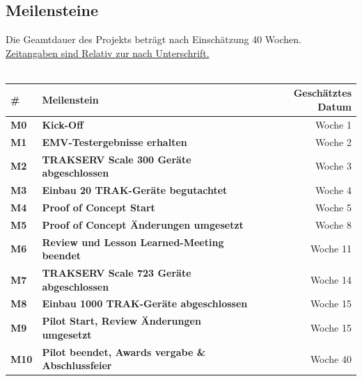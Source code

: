 \documentclass[a4paper,10pt]{scrartcl}
\begin{document}
\subsection{Meilensteine}
Die Geamtdauer des Projekts beträgt nach Einschätzung 40 Wochen.\\
\uline{Zeitangaben sind Relativ zur nach Unterschrift.}\\
\vspace{5mm}\\
\begin{tabular}{llr} 
\toprule
\textbf{\#} & \textbf{Meilenstein} & \textbf{Geschätztes Datum}\\ 
\midrule 
\midrule
\textbf{M0}  & \textbf{Kick-Off} & Woche 1\\
\midrule
\textbf{M1}  & \textbf{EMV-Testergebnisse erhalten} & Woche 2\\ %
\midrule
\textbf{M2}  & \textbf{TRAKSERV Scale 300 Geräte abgeschlossen} & Woche 3\\ %
\midrule
\textbf{M3}  & \textbf{Einbau 20 TRAK-Geräte begutachtet} & Woche 4\\ %
\midrule
\textbf{M4}  & \textbf{Proof of Concept Start} & Woche 5\\ %
\midrule
\textbf{M5}  & \textbf{Proof of Concept Änderungen umgesetzt} & Woche 8\\ %
\midrule
\textbf{M6}  & \textbf{Review und Lesson Learned-Meeting beendet} & Woche 11\\ %
\midrule
\textbf{M7}  & \textbf{TRAKSERV Scale 723 Geräte abgeschlossen} & Woche 14\\ %
\midrule
\textbf{M8}  & \textbf{Einbau 1000 TRAK-Geräte abgeschlossen} & Woche 15\\ %
\midrule
\textbf{M9}  & \textbf{Pilot Start, Review Änderungen umgesetzt} & Woche 15\\ %
\midrule
\textbf{M10}  & \textbf{Pilot beendet, Awards vergabe \& Abschlussfeier} & Woche 40\\ %
\bottomrule
\end{tabular}
\end{document}
